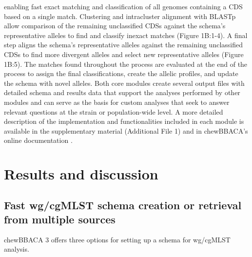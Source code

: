enabling fast exact matching and classification of all genomes containing a CDS based on a single match. Clustering and intracluster alignment with BLASTp allow comparison of the remaining unclassified CDSs against the schema's representative alleles to find and classify inexact matches (Figure 1B:1-4). A final step aligns the schema's representative alleles against the remaining unclassified CDSs to find more divergent alleles and select new representative alleles (Figure 1B:5). The matches found throughout the process are evaluated at the end of the process to assign the final classifications, create the allelic profiles, and update the schema with novel alleles. Both core modules create several output files with detailed schema and results data that support the analyses performed by other modules and can serve as the basis for custom analyses that seek to answer relevant questions at the strain or population-wide level.
A more detailed description of the implementation and functionalities included in each module is available in the supplementary material (Additional File 1) and in chewBBACA’s online documentation \citep{noauthor_chewbbaca_nodate}.

% 



\section{Results and discussion} \label{sec:results_and_discussion}

\subsection{Fast wg/cgMLST schema creation or retrieval from multiple sources} \label{ssec:results_discussion_ssec1}

chewBBACA 3 offers three options for setting up a schema for wg/cgMLST analysis.

